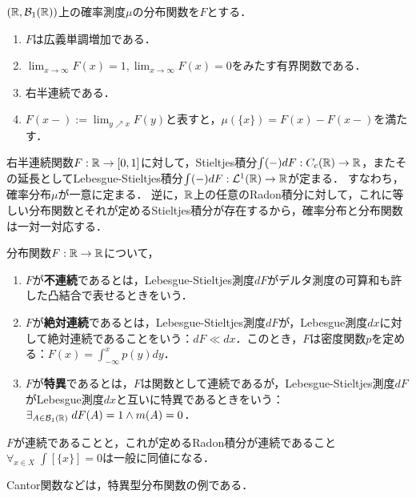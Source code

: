 \documentclass[uplatex,dvipdfmx]{jsreport}
\begin{document}
\begin{lemma}[分布関数の特徴付け]
    $(\mathbb{R},\mathcal{B}_1(\mathbb{R}))$上の確率測度$\mu$の分布関数を$F$とする．
    \begin{enumerate}
        \item $F$は広義単調増加である．
        \item $\lim_{x\to\infty}F(x)=1,\lim_{x\to\infty}F(x)=0$をみたす有界関数である．
        \item 右半連続である．
        \item $F(x-):=\lim_{y\nearrow x}F(y)$と表すと，$\mu(\{x\})=F(x)-F(x-)$を満たす．
    \end{enumerate}
\end{lemma}
\begin{remarks}
    右半連続関数$F:\mathbb{R}\to[0,1]$に対して，Stieltjes積分$\int(-)dF:C_c(\mathbb{R})\to\mathbb{R}$，またその延長としてLebesgue-Stieltjes積分$\int(-)dF:\mathcal{L}^1(\mathbb{R})\to\mathbb{R}$が定まる．
    すなわち，確率分布$\mu$が一意に定まる．
    逆に，$\mathbb{R}$上の任意のRadon積分に対して，これに等しい分布関数とそれが定めるStieltjes積分が存在するから，確率分布と分布関数は一対一対応する．
\end{remarks}

\begin{definition}
    分布関数$F:\mathbb{R}\to\mathbb{R}$について，
    \begin{enumerate}
        \item $F$が\textbf{不連続}であるとは，Lebesgue-Stieltjes測度$dF$がデルタ測度の可算和も許した凸結合で表せるときをいう．
        \item $F$が\textbf{絶対連続}であるとは，Lebesgue-Stieltjes測度$dF$が，Lebesgue測度$dx$に対して絶対連続であることをいう：$dF\ll dx$．このとき，$F$は密度関数$p$を定める：$F(x)=\int_{-\infty}^xp(y)dy$．
        \item $F$が\textbf{特異}であるとは，$F$は関数として連続であるが，Lebesgue-Stieltjes測度$dF$がLebesgue測度$dx$と互いに特異であるときをいう：$\exists_{A\in\mathcal{B}_1(\mathbb{R})}\;dF(A)=1\land m(A)=0$．
    \end{enumerate}
\end{definition}
\begin{remark}
    $F$が連続であることと，これが定めるRadon積分が連続であること$\forall_{x\in X}\;\int[\{x\}]=0$は一般に同値になる．
\end{remark}

\begin{example}
    Cantor関数などは，特異型分布関数の例である．
\end{example}
\end{document}
